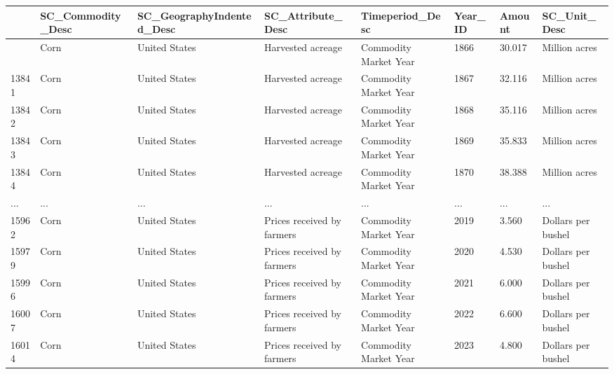 \documentclass[
  letterpaper,
  DIV=11,
  numbers=noendperiod]{scrreprt}
\begin{document}
\begin{longtable}[]{@{}llllllll@{}}
\toprule\noalign{}
& SC\_Commodity\_Desc & SC\_GeographyIndented\_Desc &
SC\_Attribute\_Desc & Timeperiod\_Desc & Year\_ID & Amount &
SC\_Unit\_Desc \\
\midrule\noalign{}
\endhead
\bottomrule\noalign{}
\endlastfoot
13840 & Corn & United States & Harvested acreage & Commodity Market Year
& 1866 & 30.017 & Million acres \\
13841 & Corn & United States & Harvested acreage & Commodity Market Year
& 1867 & 32.116 & Million acres \\
13842 & Corn & United States & Harvested acreage & Commodity Market Year
& 1868 & 35.116 & Million acres \\
13843 & Corn & United States & Harvested acreage & Commodity Market Year
& 1869 & 35.833 & Million acres \\
13844 & Corn & United States & Harvested acreage & Commodity Market Year
& 1870 & 38.388 & Million acres \\
... & ... & ... & ... & ... & ... & ... & ... \\
15962 & Corn & United States & Prices received by farmers & Commodity
Market Year & 2019 & 3.560 & Dollars per bushel \\
15979 & Corn & United States & Prices received by farmers & Commodity
Market Year & 2020 & 4.530 & Dollars per bushel \\
15996 & Corn & United States & Prices received by farmers & Commodity
Market Year & 2021 & 6.000 & Dollars per bushel \\
16007 & Corn & United States & Prices received by farmers & Commodity
Market Year & 2022 & 6.600 & Dollars per bushel \\
16014 & Corn & United States & Prices received by farmers & Commodity
Market Year & 2023 & 4.800 & Dollars per bushel \\
\end{longtable}
\end{document}
